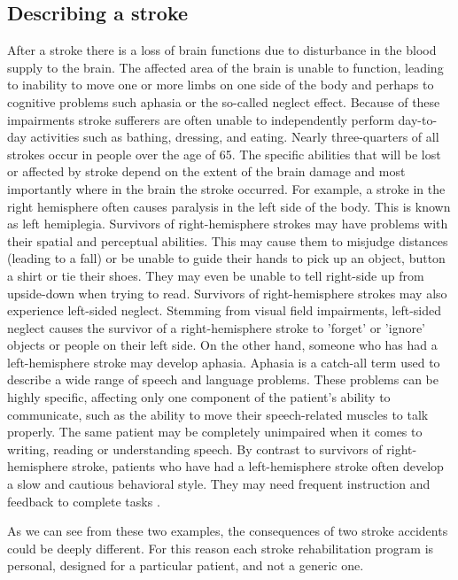 \documentclass[preprint,authoryear,12pt]{elsarticle}
\begin{document}
\subsection{Describing a stroke}
\label{stroke}
After a stroke there is a loss of brain functions due to disturbance in the blood supply to the brain. The affected area of the brain is unable to function, leading to inability to move one or more limbs on one side of the body and perhaps to cognitive problems such aphasia or the so-called neglect effect. Because of these impairments stroke sufferers are often unable to independently perform day-to-day activities such as bathing, dressing, and eating. Nearly three-quarters of all strokes occur in people over the age of 65. The specific abilities that will be lost or affected by stroke depend on the extent of the brain damage and most importantly where in the brain the stroke occurred. For example, a stroke in the right hemisphere often causes paralysis in the left side of the body. This is known as left hemiplegia. Survivors of right-hemisphere strokes may have problems with their spatial and perceptual abilities. This may cause them to misjudge distances (leading to a fall) or be unable to guide their hands to pick up an object, button a shirt or tie their shoes. They may even be unable to tell right-side up from upside-down when trying to read. Survivors of right-hemisphere strokes may also experience left-sided neglect. Stemming from visual field impairments, left-sided neglect causes the survivor of a right-hemisphere stroke to 'forget' or 'ignore' objects or people on their left side. 
On the other hand, someone who has had a left-hemisphere stroke may develop aphasia. Aphasia is a catch-all term used to describe a wide range of speech and language problems. These problems can be highly specific, affecting only one component of the patient's ability to communicate, such as the ability to move their speech-related muscles to talk properly. The same patient may be completely unimpaired when it comes to writing, reading or understanding speech. By contrast to survivors of right-hemisphere stroke, patients who have had a left-hemisphere stroke often develop a slow and cautious behavioral style. They may need frequent instruction and feedback to complete tasks  \citep[information from the][]{strokeEffects}.

As we can see from these two examples, the consequences of  two stroke accidents could be deeply different. For this reason each stroke rehabilitation program is personal, designed for a particular patient, and not a generic one. 
\end{document}
